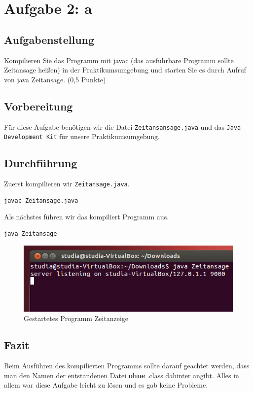 \newpage
\section{Aufgabe 2: a}

\subsection{Aufgabenstellung}
Kompilieren Sie das Programm mit javac (das ausfuhrbare Programm sollte Zeitansage
heißen) in der Praktikumsumgebung und starten Sie es durch Aufruf von java Zeitansage.
(0,5 Punkte)

\subsection{Vorbereitung}
Für diese Aufgabe benötigen wir die Datei \texttt{Zeitansansage.java} und das \texttt{Java Development Kit} für unsere Praktikumsumgebung.

\subsection{Durchführung}
Zuerst kompilieren wir \texttt{Zeitansage.java}.

\begin{lstlisting}
javac Zeitansage.java
\end{lstlisting}
Als nächstes führen wir das kompiliert Programm aus.

\begin{lstlisting}
java Zeitansage
\end{lstlisting}

\begin{figure}[H]
	\centering
	\includegraphics[width=0.4 \linewidth]{images/13}
	\caption{Gestartetes Programm Zeitanzeige}
\end{figure}

\subsection{Fazit}
Beim Ausführen des kompilierten Programms sollte darauf geachtet werden, dass man den Namen der entstandenen Datei \textbf{ohne} .class dahinter angibt. Alles in allem war diese Aufgabe leicht zu lösen und es gab keine Probleme.

